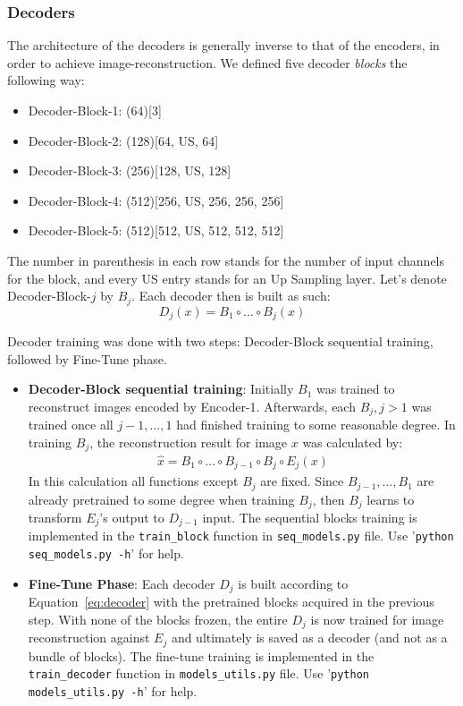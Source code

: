 \subsubsection{Decoders}\label{subsec:Decoders}
The architecture of the decoders is generally inverse to that of the encoders, in order to achieve image-reconstruction. We defined five decoder \textit{blocks} the following way:
\begin{itemize}
	\item Decoder-Block-1: (64)[3]
	\item Decoder-Block-2: (128)[64, US, 64]
	\item Decoder-Block-3: (256)[128, US, 128]
	\item Decoder-Block-4: (512)[256, US, 256, 256, 256]
	\item Decoder-Block-5: (512)[512, US, 512, 512, 512]
\end{itemize}
The number in parenthesis in each row stands for the number of input channels for the block, and every US entry stands for an Up Sampling layer. Let's denote Decoder-Block-$j$ by $B_j$. Each decoder then is built as such:
\begin{equation}\label{eq:decoder}
D_j(x) = B_1 \circ \dots \circ B_j (x)
\end{equation}

Decoder training was done with two steps: Decoder-Block sequential training, followed by Fine-Tune phase.
\begin{itemize}
	\item \textbf{Decoder-Block sequential training}: Initially $B_1$ was trained to reconstruct images encoded by Encoder-1. Afterwards, each $B_j, j>1$ was trained once all $j-1,\dots,1$ had finished training to some reasonable degree. In training $B_j$, the reconstruction result for image $x$ was calculated by:
	\begin{gather*}
	\hat{x} = B_1 \circ \dots \circ B_{j-1} \circ B_j \circ E_j (x)
	\end{gather*}
	In this calculation all functions except $B_j$ are fixed. Since $B_{j-1}, \dots, B_1$ are already pretrained to some degree when training $B_j$, then $B_j$ learns to transform $E_j$'s output to $D_{j-1}$ input. The sequential blocks training is implemented in the \texttt{train\_block} function in \texttt{seq\_models.py} file. Use '\texttt{python seq\_models.py -h}' for help.

	\item \textbf{Fine-Tune Phase}: Each decoder $D_j$ is built according to Equation~\ref*{eq:decoder} with the pretrained blocks acquired in the previous step. With none of the blocks frozen, the entire $D_j$ is now trained for image reconstruction against $E_j$ and ultimately is saved as a decoder (and not as a bundle of blocks). The fine-tune training is implemented in the \texttt{train\_decoder} function in \texttt{models\_utils.py} file. Use '\texttt{python models\_utils.py -h}' for help.
\end{itemize}

